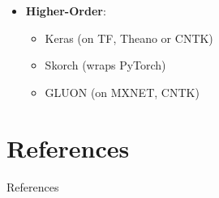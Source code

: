 \documentclass[hyperref={pdfpagelabels=false}]{beamer}
\begin{document}
\begin{frame}
\begin{minipage}[t]{0.45\textwidth}
       \end{minipage}%
       \hfill
       \begin{minipage}[t]{0.55\textwidth}
         \vspace{0pt}
         \begin{itemize}[<.->]
           \item  \textbf{Higher-Order}:
             \begin{itemize}[<.->]
             \item \small{\textcolor{visiblered}{Keras (on TF, Theano or CNTK)}}
             \item \small{\textcolor{visiblered}{Skorch (wraps PyTorch)}}
             \item \small{\textcolor{visiblered}{GLUON (on MXNET, CNTK)}}
             \end{itemize}
           \end{itemize}
       \end{minipage}
     \end{frame}

     \section{References}

     \begin{frame}[c] %
       \begin{center}
         \vspace{8mm}
         \LARGE References
       \end{center}
     \end{frame}

     
     \begin{frame}[allowframebreaks]
       
       \tiny \printbibliography
     \end{frame}
\end{document}
